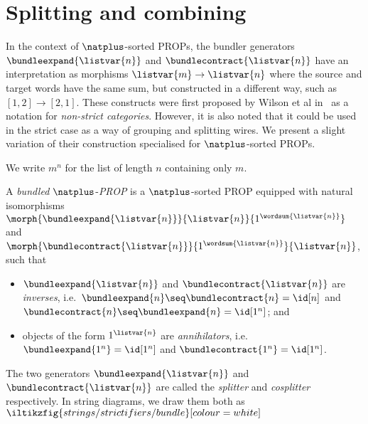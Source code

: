 \section{Splitting and combining}

In the context of \(\natplus\)-sorted PROPs, the bundler generators
\(\bundleexpand{\listvar{n}}\) and \(\bundlecontract{\listvar{n}}\) have an
interpretation as morphisms
\(\listvar{m} \to \listvar{n}\) where the source and target words have the
same sum, but constructed in a different way, such as \([1,2] \to [2,1]\).
These constructs were first proposed by Wilson et al in~\cite{wilson2023string}
as a notation for \emph{non-strict categories}.
However, it is also noted that it could be used in the strict case as a way of
grouping and splitting wires.
We present a slight variation of their construction specialised for
\(\natplus\)-sorted PROPs.

\begin{notation}
    We write \(m^n\) for the list of length \(n\) containing only \(m\).
\end{notation}

\begin{definition}
    A \emph{bundled} \(\natplus\)-\emph{PROP} is a \(\natplus\)-sorted PROP
    equipped with natural isomorphisms \(
        \morph{\bundleexpand{\listvar{n}}}{\listvar{n}}{1^{\wordsum{\listvar{n}}}}
    \) and \(
        \morph{\bundlecontract{\listvar{n}}}{1^{\wordsum{\listvar{n}}}}{\listvar{n}}
    \), such that
    \begin{itemize}
        \item \(\bundleexpand{\listvar{n}}\) and \(\bundlecontract{\listvar{n}}\)
                are \emph{inverses}, i.e.\ \(
                    \bundleexpand{n} \seq \bundlecontract{n} = \id[n]
                \) and \(
                    \bundlecontract{n} \seq \bundleexpand{n} = \id[1^n]
                \); and
        \item objects of the form \(1^{\listvar{n}}\) are \emph{annihilators},
                i.e.\ \(
                    \bundleexpand{1^n} = \id[1^n]
                \) and \(
                    \bundlecontract{1^n} = \id[1^n]
                \).
    \end{itemize}
\end{definition}

The two generators \(
    \bundleexpand{\listvar{n}}
\) and \(
    \bundlecontract{\listvar{n}}
\) are called the \emph{splitter} and \emph{cosplitter} respectively.
In string diagrams, we draw them both as \(
    \iltikzfig{strings/strictifiers/bundle}[colour=white]
\)

